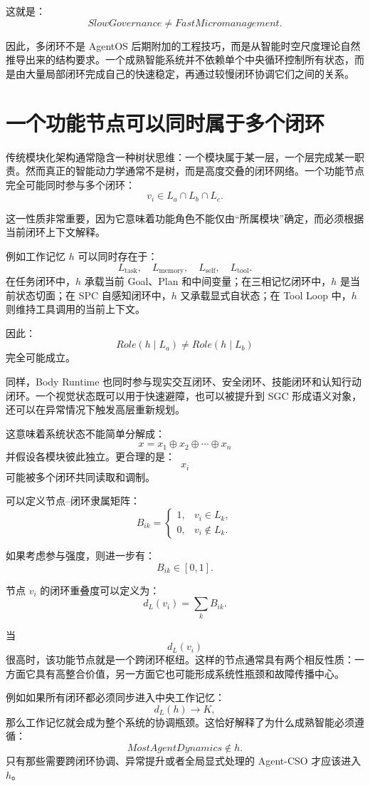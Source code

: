 这就是：
\[
\boxed{
SlowGovernance
\neq
FastMicromanagement.
}
\]

因此，多闭环不是 AgentOS 后期附加的工程技巧，而是从智能时空尺度理论自然推导出来的结构要求。一个成熟智能系统并不依赖单个中央循环控制所有状态，而是由大量局部闭环完成自己的快速稳定，再通过较慢闭环协调它们之间的关系。


\section{一个功能节点可以同时属于多个闭环}

传统模块化架构通常隐含一种树状思维：一个模块属于某一层，一个层完成某一职责。然而真正的智能动力学通常不是树，而是高度交叠的闭环网络。一个功能节点完全可能同时参与多个闭环：
\[
v_i
\in
L_a\cap L_b\cap L_c.
\]

这一性质非常重要，因为它意味着功能角色不能仅由“所属模块”确定，而必须根据当前闭环上下文解释。

例如工作记忆 $h$ 可以同时存在于：
\[
L_{\mathrm{task}},
\quad
L_{\mathrm{memory}},
\quad
L_{\mathrm{self}},
\quad
L_{\mathrm{tool}}.
\]
在任务闭环中，$h$ 承载当前 Goal、Plan 和中间变量；在三相记忆闭环中，$h$ 是当前状态切面；在 SPC 自感知闭环中，$h$ 又承载显式自状态；在 Tool Loop 中，$h$ 则维持工具调用的当前上下文。

因此：
\[
Role(h\mid L_a)
\neq
Role(h\mid L_b)
\]
完全可能成立。

同样，Body Runtime 也同时参与现实交互闭环、安全闭环、技能闭环和认知行动闭环。一个视觉状态既可以用于快速避障，也可以被提升到 SGC 形成语义对象，还可以在异常情况下触发高层重新规划。

这意味着系统状态不能简单分解成：
\[
x
=
x_1\oplus x_2\oplus\cdots\oplus x_n
\]
并假设各模块彼此独立。更合理的是：
\[
x_i
\]
可能被多个闭环共同读取和调制。

可以定义节点--闭环隶属矩阵：
\[
B_{ik}
=
\begin{cases}
1, & v_i\in L_k,\\
0, & v_i\notin L_k.
\end{cases}
\]

如果考虑参与强度，则进一步有：
\[
B_{ik}\in[0,1].
\]

节点 $v_i$ 的闭环重叠度可以定义为：
\[
d_L(v_i)
=
\sum_k B_{ik}.
\]

当
\[
d_L(v_i)
\]
很高时，该功能节点就是一个跨闭环枢纽。这样的节点通常具有两个相反性质：一方面它具有高整合价值，另一方面它也可能形成系统性瓶颈和故障传播中心。

例如如果所有闭环都必须同步进入中央工作记忆：
\[
d_L(h)\rightarrow K,
\]
那么工作记忆就会成为整个系统的协调瓶颈。这恰好解释了为什么成熟智能必须遵循：
\[
MostAgentDynamics\notin h.
\]
只有那些需要跨闭环协调、异常提升或者全局显式处理的 Agent-CSO 才应该进入 $h$。

